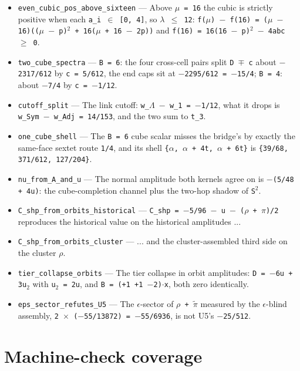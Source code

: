 \documentclass[11pt]{article}
\theoremstyle{plain}
\theoremstyle{definition}
\theoremstyle{remark}
\begin{document}
\begin{itemize}
\item \texttt{even\_cubic\_pos\_above\_sixteen} --- Above \texttt{$\mu$ = 16} the cubic is strictly positive when each \texttt{a\_i $\in$ [0, 4]}, so \texttt{$\lambda$ $\le$ 12}: \texttt{f($\mu$) $-$ f(16) = ($\mu$ $-$ 16)(($\mu$ $-$ p)$^2$ + 16($\mu$ + 16 $-$ 2p))} and \texttt{f(16) = 16(16 $-$ p)$^2$ $-$ 4abc $\ge$ 0}.
\item \texttt{two\_cube\_spectra} --- \texttt{B = 6}: the four cross-cell pairs split \texttt{D $\mp$ c} about \texttt{$-$2317/612} by \texttt{c = 5/612}, the end caps sit at \texttt{$-$2295/612 = $-$15/4}; \texttt{B = 4}: about \texttt{$-$7/4} by \texttt{c = $-$1/12}.
\item \texttt{cutoff\_split} --- The link cutoff: \texttt{w\_$\Lambda$ $-$ w\_1 = $-$1/12}, what it drops is \texttt{w\_Sym $-$ w\_Adj = 14/153}, and the two sum to \texttt{t\_3}.
\item \texttt{one\_cube\_shell} --- The \texttt{B = 6} cube scalar misses the bridge's by exactly the same-face sextet route \texttt{1/4}, and its shell \texttt{\{$\alpha$, $\alpha$ + 4t, $\alpha$ + 6t\}} is \texttt{\{39/68, 371/612, 127/204\}}.
\item \texttt{nu\_from\_A\_and\_u} --- The normal amplitude both kernels agree on is \texttt{$-$(5/48 + 4u)}: the cube-completion channel plus the two-hop shadow of \texttt{S$^2$}.
\item \texttt{C\_shp\_from\_orbits\_historical} --- \texttt{C\_shp = $-$5/96 $-$ u $-$ ($\rho$ + $\pi$)/2} reproduces the historical value on the historical amplitudes ...
\item \texttt{C\_shp\_from\_orbits\_cluster} --- ... and the cluster-assembled third side on the cluster \texttt{$\rho$}.
\item \texttt{tier\_collapse\_orbits} --- The tier collapse in orbit amplitudes: \texttt{D = $-$6u + 3u$_2$} with \texttt{u$_2$ = 2u}, and \texttt{B = (+1 +1 $-$2)$\cdot$x}, both zero identically.
\item \texttt{eps\_sector\_refutes\_U5} --- The $\epsilon$-sector of \texttt{$\rho$ + $\tilde\pi$} measured by the $\epsilon$-blind assembly, \texttt{2 $\times$ ($-$55/13872) = $-$55/6936}, is not U5's \texttt{$-$25/512}.
\end{itemize}
\endgroup

\section{Machine-check coverage}\label{app:coverage}
\end{document}
